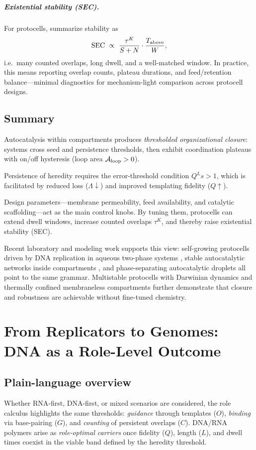 \documentclass[12pt,a4paper,oneside]{scrreprt}
\begin{document}
\paragraph{Existential stability (SEC).}
For protocells, summarize stability as
\[
\mathrm{SEC}\ \propto\ \frac{\tau^K}{S+N}\cdot\frac{T_{\rm above}}{W},
\]
i.e.\ many counted overlaps, long dwell, and a well-matched window. 
In practice, this means reporting overlap counts, plateau durations, and feed/retention balance—minimal diagnostics for mechanism-light comparison across protocell designs.

\section*{Summary}
Autocatalysis within compartments produces \emph{thresholded organizational closure}: systems cross seed and persistence thresholds, then exhibit coordination plateaus with on/off hysteresis (loop area $\mathcal A_{\rm loop}>0$). 

Persistence of heredity requires the error-threshold condition $Q^L s>1$, which is facilitated by reduced loss ($\Lambda \downarrow$) and improved templating fidelity ($Q \uparrow$). 

Design parameters—membrane permeability, feed availability, and catalytic scaffolding—act as the main control knobs. By tuning them, protocells can extend dwell windows, increase counted overlaps $\tau^K$, and thereby raise existential stability (SEC). 

Recent laboratory and modeling work supports this view: self-growing protocells driven by DNA replication in aqueous two-phase systems \cite{Minagawa2025SelfGrowingProtocells}, stable autocatalytic networks inside compartments \cite{Sanders2025AutocatalysisProtocell}, and phase-separating autocatalytic droplets \cite{Hanopolskyi2023CoacervateAutocatalysis} all point to the same grammar. Multistable protocells with Darwinian dynamics \cite{Singh2023MultistableProtocells} and thermally confined membraneless compartments \cite{Floroni2025ThermophoreticProtocell} further demonstrate that closure and robustness are achievable without fine-tuned chemistry.


\chapter{From Replicators to Genomes: DNA as a Role-Level Outcome}\label{ch:life-dna}

\section*{Plain-language overview}
Whether RNA-first, DNA-first, or mixed scenarios are considered, the role calculus highlights the same thresholds: \emph{guidance} through templates ($O$), \emph{binding} via base-pairing ($G$), and \emph{counting} of persistent overlaps ($C$). 
DNA/RNA polymers arise as \emph{role-optimal carriers} once fidelity ($Q$), length ($L$), and dwell times coexist in the viable band defined by the heredity threshold.
\end{document}

